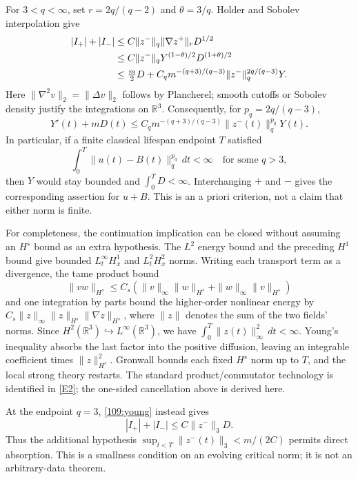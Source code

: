 \documentclass[11pt,a4paper]{article}
\newcommand{\R}{\mathbb{R}}
\newcommand{\eref}[2]{\hyperlink{extra:#1:#2}{[E#2]}}
\numberwithin{equation}{section}
\begin{document}
For $3<q<\infty$, set $r=2q/(q-2)$ and $\theta=3/q$.
Holder and Sobolev interpolation give
\begin{align}
 |I_+|+|I_-|
 &\leq C\|z^-\|_q\|\nabla z^+\|_r D^{1/2} \notag\\
 &\leq C\|z^-\|_q Y^{(1-\theta)/2}D^{(1+\theta)/2} \notag\\
 &\leq \tfrac m2D+
 C_qm^{-(q+3)/(q-3)}\|z^-\|_q^{2q/(q-3)}Y.
 \label{109:young}
\end{align}
Here $\|\nabla^2v\|_2=\|\Delta v\|_2$ follows by Plancherel; smooth
cutoffs or Sobolev density justify the integrations on $\R^3$.
Consequently, for $p_q=2q/(q-3)$,
\begin{equation}\label{109:gronwall}
 Y'(t)+mD(t)\leq
 C_qm^{-(q+3)/(q-3)}\|z^-(t)\|_q^{p_q}Y(t).
\end{equation}
In particular, if a finite classical lifespan endpoint $T$ satisfied
\begin{equation}\label{109:missing}
 \int_0^T\|u(t)-B(t)\|_q^{p_q}\,dt<\infty
 \quad\text{for some }q>3,
\end{equation}
then $Y$ would stay bounded and $\int_0^TD<\infty$.
Interchanging $+$ and $-$ gives the corresponding assertion for $u+B$.
This is an a priori criterion, not a claim that either norm is finite.

For completeness, the continuation implication can be closed without
assuming an $H^s$ bound as an extra hypothesis. The $L^2$ energy bound
and the preceding $H^1$ bound give bounded $L^\infty_tH^1_x$ and
$L^2_tH^2_x$ norms. Writing each transport term as a divergence, the tame product bound
\[
 \|vw\|_{H^s}\leq C_s(\|v\|_\infty\|w\|_{H^s}
                          +\|w\|_\infty\|v\|_{H^s})
\]
and one integration by parts bound the higher-order nonlinear energy by
$C_s\|z\|_\infty\|z\|_{H^s}\|\nabla z\|_{H^s}$, where $\|z\|$
denotes the sum of the two fields' norms. Since
$H^2(\R^3)\hookrightarrow L^\infty(\R^3)$, we have
$\int_0^T\|z(t)\|_\infty^2\,dt<\infty$.
Young's inequality absorbs the last factor into the positive diffusion,
leaving an integrable coefficient times $\|z\|_{H^s}^2$.
Gronwall bounds each fixed $H^s$ norm up to $T$, and the local strong
theory restarts. The standard product/commutator technology is identified
in \eref{109}{2}; the one-sided cancellation above is derived here.

At the endpoint $q=3$, \eqref{109:young} instead gives
\[
 |I_+|+|I_-|\leq C\|z^-\|_3D.
\]
Thus the additional hypothesis
$\sup_{t<T}\|z^-(t)\|_3<m/(2C)$ permits direct absorption. This is a
smallness condition on an evolving critical norm; it is not an
arbitrary-data theorem.
\end{document}
